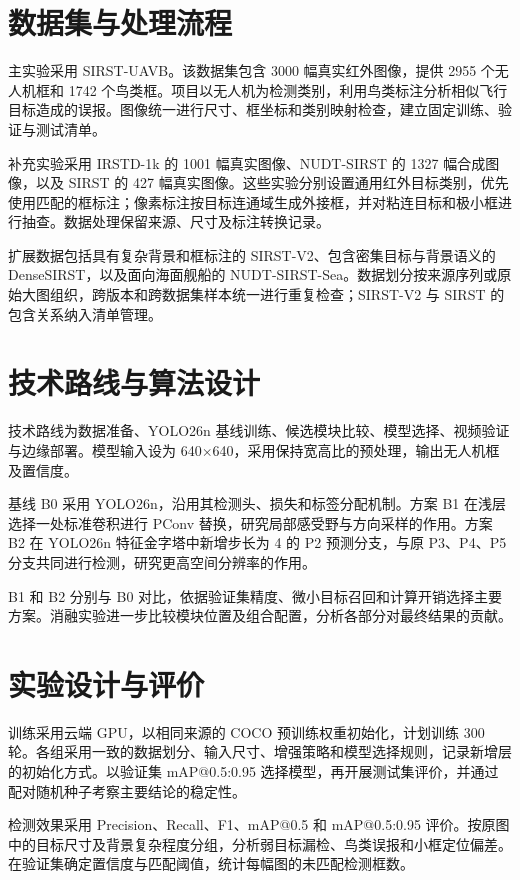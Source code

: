 \section{数据集与处理流程}
主实验采用 SIRST-UAVB。该数据集包含 3000 幅真实红外图像，提供 2955 个无人机框和 1742 个鸟类框\cite{yang2025pconv}。项目以无人机为检测类别，利用鸟类标注分析相似飞行目标造成的误报。图像统一进行尺寸、框坐标和类别映射检查，建立固定训练、验证与测试清单。

补充实验采用 IRSTD-1k 的 1001 幅真实图像、NUDT-SIRST 的 1327 幅合成图像，以及 SIRST 的 427 幅真实图像\cite{zhang2022isnet,li2023dnanet,dai2021acm}。这些实验分别设置通用红外目标类别，优先使用匹配的框标注；像素标注按目标连通域生成外接框，并对粘连目标和极小框进行抽查。数据处理保留来源、尺寸及标注转换记录。

扩展数据包括具有复杂背景和框标注的 SIRST-V2、包含密集目标与背景语义的 DenseSIRST，以及面向海面舰船的 NUDT-SIRST-Sea\cite{dai2023oscar,xiao2025bafe,wu2023mtunet}。数据划分按来源序列或原始大图组织，跨版本和跨数据集样本统一进行重复检查；SIRST-V2 与 SIRST 的包含关系纳入清单管理。

\section{技术路线与算法设计}
技术路线为数据准备、YOLO26n 基线训练、候选模块比较、模型选择、视频验证与边缘部署。模型输入设为 640$\times$640，采用保持宽高比的预处理，输出无人机框及置信度。

基线 B0 采用 YOLO26n，沿用其检测头、损失和标签分配机制\cite{jocher2026yolo26,ultralytics2026docs}。方案 B1 在浅层选择一处标准卷积进行 PConv 替换，研究局部感受野与方向采样的作用\cite{yang2025pconv}。方案 B2 在 YOLO26n 特征金字塔中新增步长为 4 的 P2 预测分支，与原 P3、P4、P5 分支共同进行检测，研究更高空间分辨率的作用。

B1 和 B2 分别与 B0 对比，依据验证集精度、微小目标召回和计算开销选择主要方案。消融实验进一步比较模块位置及组合配置，分析各部分对最终结果的贡献。

\section{实验设计与评价}
训练采用云端 GPU，以相同来源的 COCO 预训练权重初始化，计划训练 300 轮。各组采用一致的数据划分、输入尺寸、增强策略和模型选择规则，记录新增层的初始化方式。以验证集 mAP@0.5:0.95 选择模型，再开展测试集评价，并通过配对随机种子考察主要结论的稳定性。

检测效果采用 Precision、Recall、F1、mAP@0.5 和 mAP@0.5:0.95 评价。按原图中的目标尺寸及背景复杂程度分组，分析弱目标漏检、鸟类误报和小框定位偏差。在验证集确定置信度与匹配阈值，统计每幅图的未匹配检测框数。

